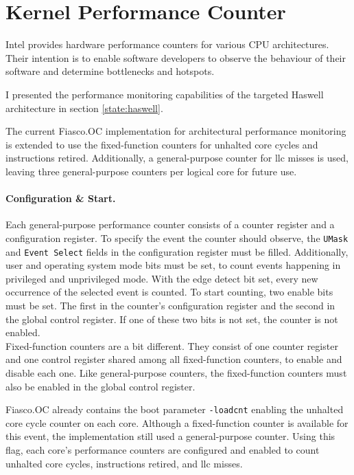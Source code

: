 \section{Kernel Performance Counter}
\label{impl:perfcounter}

Intel provides hardware performance counters for various CPU
architectures.
Their intention is to enable software developers to observe the behaviour of
their software and determine bottlenecks and hotspots.

I presented the performance monitoring capabilities of the targeted Haswell
architecture in section \ref{state:haswell}.

The current Fiasco.OC implementation for architectural performance monitoring is
extended to use the fixed-function counters for unhalted core cycles and
instructions retired.
Additionally, a general-purpose counter for \gls{llc} misses is used,
leaving three general-purpose counters per logical core for future use.

\paragraph{Configuration \& Start.}
Each general-purpose performance counter consists of a counter register and a
configuration register.
To specify the event the counter should observe, the \texttt{UMask} and
\texttt{Event Select} fields in the configuration register must be filled.
Additionally, user and operating system mode bits must be set, to count events
happening in privileged and unprivileged mode.
With the edge detect bit set, every new occurrence of the selected event is
counted.
To start counting, two enable bits must be set.
The first in the counter's configuration register and the second in the global
control register.
If one of these two bits is not set, the counter is not enabled.
\\

Fixed-function counters are a bit different.
They consist of one counter register and one control register shared among all
fixed-function counters, to enable and disable each one.
Like general-purpose counters, the fixed-function counters must also be enabled
in the global control register.

Fiasco.OC already contains the boot parameter \texttt{-loadcnt} enabling the
unhalted core cycle counter on each core.
Although a fixed-function counter is available for this event, the
implementation still used a general-purpose counter.
Using this flag, each core's performance counters are configured and enabled to
count unhalted core cycles, instructions retired, and \gls{llc} misses.

